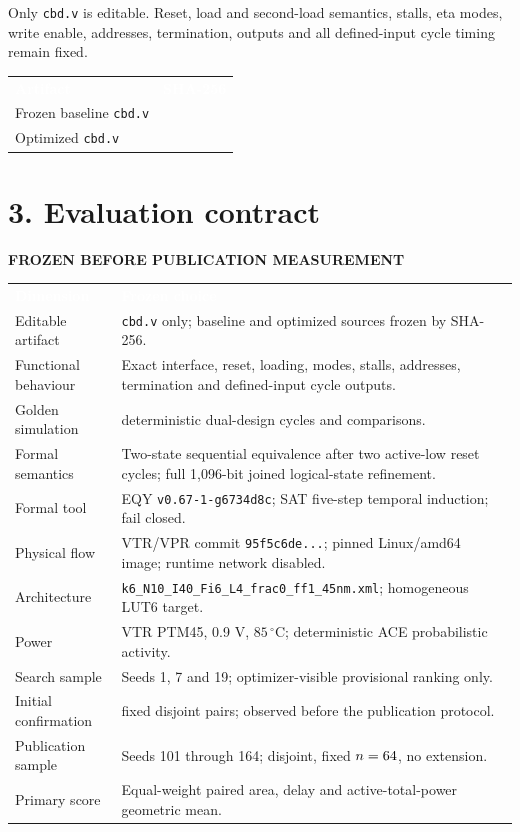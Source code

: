 \documentclass[10pt,a4paper]{article}
\newcommand{\hash}[1]{{\scriptsize\ttfamily\seqsplit{#1}}}
\newcommand{\smallcaps}[1]{\textcolor{Mid}{\fontsize{8.5}{10}\selectfont\bfseries\MakeUppercase{#1}}}
\newcommand{\newpageheading}[2]{\clearpage\section{#1}\smallcaps{#2}\vspace{6pt}}
\newcommand{\thead}[1]{\textcolor{white}{\textbf{#1}}}
\begin{document}
Only \texttt{cbd.v} is editable. Reset, load and second-load semantics, stalls, eta modes, write enable, addresses, termination, outputs and all defined-input cycle timing remain fixed.

{\small
{}
\begin{tabularx}{\textwidth}{@{}P{52mm}Y@{}}
\thead{Artifact} & \thead{SHA-256} \\
Frozen baseline \texttt{cbd.v} & \hash{\BaselineHash} \\
Optimized \texttt{cbd.v} & \hash{\OptimizedHash} \\
\end{tabularx}
}

\newpageheading{3. Evaluation contract}{Frozen before publication measurement}

{\small
{}
\begin{tabularx}{\textwidth}{@{}B{39mm}Y@{}}
\thead{Dimension} & \thead{Frozen choice} \\
Editable artifact & \texttt{cbd.v} only; baseline and optimized sources frozen by SHA-256. \\
Functional behaviour & Exact interface, reset, loading, modes, stalls, addresses, termination and defined-input cycle outputs. \\
Golden simulation & \FunctionalCycles{} deterministic dual-design cycles and \FunctionalChecks{} comparisons. \\
Formal semantics & Two-state sequential equivalence after two active-low reset cycles; full 1,096-bit joined logical-state refinement. \\
Formal tool & EQY \texttt{v0.67-1-g6734d8c}; SAT five-step temporal induction; fail closed. \\
Physical flow & VTR/VPR commit \texttt{95f5c6de...}; pinned Linux/amd64 image; runtime network disabled. \\
Architecture & \texttt{k6\_N10\_I40\_Fi6\_L4\_frac0\_ff1\_45nm.xml}; homogeneous LUT6 target. \\
Power & VTR PTM45, 0.9 V, $85\,^{\circ}$C; deterministic ACE probabilistic activity. \\
Search sample & Seeds 1, 7 and 19; optimizer-visible provisional ranking only. \\
Initial confirmation & \InitialPairCount{} fixed disjoint pairs; observed before the publication protocol. \\
Publication sample & Seeds 101 through 164; disjoint, fixed $n=64$, no extension. \\
Primary score & Equal-weight paired area, delay and active-total-power geometric mean. \\
\end{tabularx}
}
\end{document}

